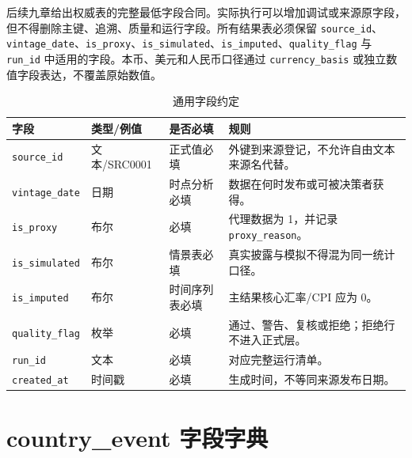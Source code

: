 \documentclass[UTF8,fontset=windows,12pt,openany]{ctexbook}
\newcommand{\Field}[1]{{\small\nolinkurl{#1}}}
\begin{document}
后续九章给出权威表的完整最低字段合同。实际执行可以增加调试或来源原字段，但不得删除主键、追溯、质量和运行字段。所有结果表必须保留 \Field{source_id}、\Field{vintage_date}、\Field{is_proxy}、\Field{is_simulated}、\Field{is_imputed}、\Field{quality_flag} 与 \Field{run_id} 中适用的字段。本币、美元和人民币口径通过 \Field{currency_basis} 或独立数值字段表达，不覆盖原始数值。

\begin{longtable}{p{3.0cm}p{3.1cm}p{3.0cm}p{4.4cm}}
\caption{通用字段约定}\label{tab:common-fields}\\
\toprule
\textbf{字段} & \textbf{类型/例值} & \textbf{是否必填} & \textbf{规则}\\
\midrule
\Field{source_id} & 文本/SRC0001 & 正式值必填 & 外键到来源登记，不允许自由文本来源名代替。\\
\Field{vintage_date} & 日期 & 时点分析必填 & 数据在何时发布或可被决策者获得。\\
\Field{is_proxy} & 布尔 & 必填 & 代理数据为 1，并记录 \Field{proxy_reason}。\\
\Field{is_simulated} & 布尔 & 情景表必填 & 真实披露与模拟不得混为同一统计口径。\\
\Field{is_imputed} & 布尔 & 时间序列表必填 & 主结果核心汇率/CPI 应为 0。\\
\Field{quality_flag} & 枚举 & 必填 & 通过、警告、复核或拒绝；拒绝行不进入正式层。\\
\Field{run_id} & 文本 & 必填 & 对应完整运行清单。\\
\Field{created_at} & 时间戳 & 必填 & 生成时间，不等同来源发布日期。\\
\bottomrule
\end{longtable}

\chapter{country\_event 字段字典}
\end{document}
